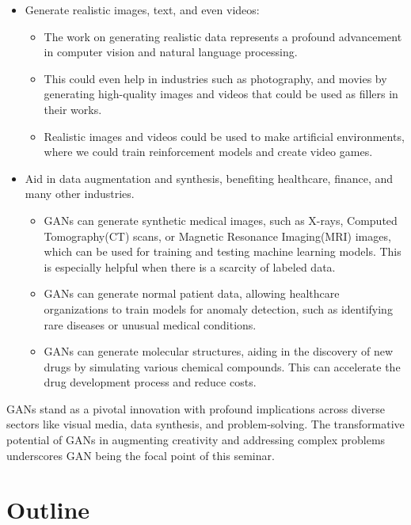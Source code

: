\begin{itemize}
    \item Generate realistic images, text, and even videos:
        \begin{itemize}
            \item The work on generating realistic data represents a profound advancement in computer vision and natural language processing.
            \item This could even help in industries such as photography, and movies by generating high-quality images and videos that could be used as fillers in their works.
            \item Realistic images and videos could be used to make artificial environments, where we could train reinforcement models and create video games.
        \end{itemize}
        
    \item Aid in data augmentation and synthesis, benefiting healthcare\cite{Data_Aug}, finance\cite{CORRGAN}, and many other industries.
        \begin{itemize}
            \item GANs can generate synthetic medical images, such as X-rays, Computed Tomography(CT) scans, or Magnetic Resonance Imaging(MRI) images, which can be used for training and testing machine learning models. This is especially helpful when there is a scarcity of labeled data.
            \item GANs can generate normal patient data, allowing healthcare organizations to train models for anomaly detection, such as identifying rare diseases or unusual medical conditions.
            \item GANs can generate molecular structures, aiding in the discovery of new drugs by simulating various chemical compounds. This can accelerate the drug development process and reduce costs.
        \end{itemize}
\end{itemize}

\noindent
GANs stand as a pivotal innovation with profound implications across diverse sectors like visual media, data synthesis, and problem-solving. The transformative potential of GANs in augmenting creativity and addressing complex problems underscores GAN being the focal point of this seminar.

\clearpage

\section{Outline}

